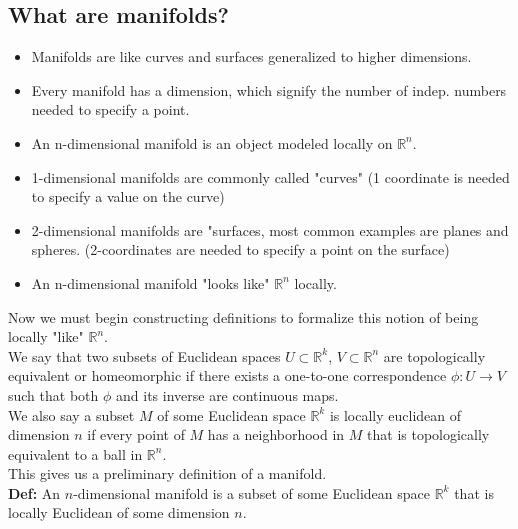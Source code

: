 \documentclass{article}
\begin{document}
\subsection{What are manifolds?}
\begin{itemize}
    \item Manifolds are like curves and surfaces generalized to higher dimensions.
    \item Every manifold has a dimension, which signify the number of indep. numbers needed to specify a point.
    \item An n-dimensional manifold is an object modeled locally on $\mathbb{R}^n$.
    \item 1-dimensional manifolds are commonly called "curves" (1 coordinate is needed to specify a value on the curve)
    \item 2-dimensional manifolds are "surfaces, most common examples are planes and spheres. (2-coordinates are needed to specify a point on the surface)
    \item An n-dimensional manifold "looks like" $\mathbb{R}^n$ locally.
\end{itemize}
Now we must begin constructing definitions to formalize this notion of being locally "like" $\mathbb{R}^n$.\\
We say that two subsets of Euclidean spaces $U\subset \mathbb{R}^k$, $V\subset\mathbb{R}^n$ are topologically equivalent or homeomorphic if there exists a one-to-one correspondence $\phi: U\to V$ such that both $\phi$ and its inverse are continuous maps.\\
We also say a subset $M$ of some Euclidean space $\mathbb{R}^k$ is locally euclidean of dimension $n$ if every point of $M$ has a neighborhood in $M$ that is topologically equivalent to a ball in $\mathbb{R}^n$.\\
This gives us a preliminary definition of a manifold.\\
\textbf{Def: } An $n$-dimensional manifold is a subset of some Euclidean space $\mathbb{R}^k$ that is locally Euclidean of some dimension $n$.
\end{document}
